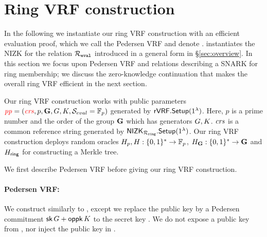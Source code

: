 \section{Ring VRF construction}%
\label{sec:pederson_vrf}

In the following we instantiate our ring VRF construction with an efficient evaluation proof, which
we call the Pedersen VRF and denote \PedVRF.
\PedVRF instantiates the NIZK for the relation $\mathcal{R}_{\mathtt{eval}}$ introduced in a general form in \S\ref{sec:overview}.
In this section we focus upon Pedersen VRF and relations describing a SNARK
for ring membership; we discuss the zero-knowledge continuation
that makes the overall ring VRF efficient in the next section.

Our ring VRF construction works with public parameters $ {\color{red}\mathit{pp}} = ({\color{red}\mathit{crs}}, p,{\mathbf{G}}, G,K, {\mathcal{S}}_{eval}  = \mathbb{F}_p)$ generated by $ {\mathsf{rVRF}}.{\mathsf{Setup}}(1^\lambda) $. Here, $ p $ is a prime number and the order of the group $ {\mathbf{G}} $ which has generators $ G,K $. {\color{red} $ \mathit{crs} $} is a common reference string generated by $ {\mathsf{NIZK}}_{\mathcal{R}_{\mathtt{ring}}}.{\mathsf{Setup}}(1^\lambda) $. Our ring VRF construction deploys random oracles $H_p,H: \{0,1\}^* \to \mathbb{F}_p$, $H_{{\mathbf{G}}}: \{0,1\}^* \to {\mathbf{G}}$ and $ H_{\mathsf{ring}} $ for constructing a Merkle tree.

We first describe Pedersen VRF before giving our ring VRF construction.
\paragraph{Pedersen VRF:} 
We construct \PedVRF similarly to 
\cite{nsec5,VXEd25519,draft-irtf-cfrg-vrf-10},
except we replace the public key by a Pedersen commitment
$\mathsf{sk} \, G + \mathsf{oppk} \, K$ to the secret key \sk.
We do not expose a public key from \KeyGen, nor inject the public key in \Eval.


